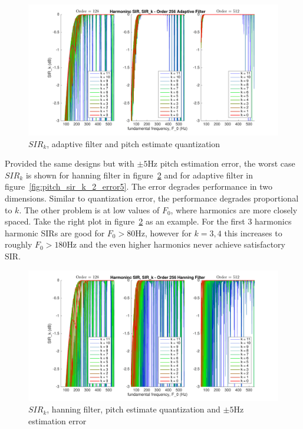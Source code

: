 \documentclass [11pt, proquest,oneside] {ganter_thesis}[2015/03/03]
\begin{document}
\begin{figure}[!ht]
  \centering
    \includegraphics[width=1\textwidth]{pitch_sir_k_2}
    \caption{$SIR_k$, adaptive filter and pitch estimate quantization}\label{fig:pitch_sir_k_2}
\end{figure}

Provided the same designs but with $\pm5$Hz pitch estimation error, the worst case $SIR_k$ is shown for hanning filter in figure~\ref{fig:pitch_sir_k_1_error5} and for adaptive filter in figure~\ref{fig:pitch_sir_k_2_error5}.  The error degrades performance in two dimensions.  Similar to quantization error, the performance degrades proportional to $k$.  The other problem is at low values of $F_0$, where harmonics are more closely spaced.  Take the right plot in figure~\ref{fig:pitch_sir_k_1_error5} as an example.  For the first 3 harmonics harmonic SIRs are good for $F_0 > 80$Hz, however for $k = 3,4$ this increases to roughly $F_0 > 180$Hz and the even higher harmonics never achieve satisfactory SIR.

\begin{figure}[!ht]
  \centering
    \includegraphics[width=1\textwidth]{pitch_sir_k_1_error5}
    \caption{$SIR_k$, hanning filter, pitch estimate quantization and $\pm5$Hz estimation error}\label{fig:pitch_sir_k_1_error5}
\end{figure}
\end{document}
